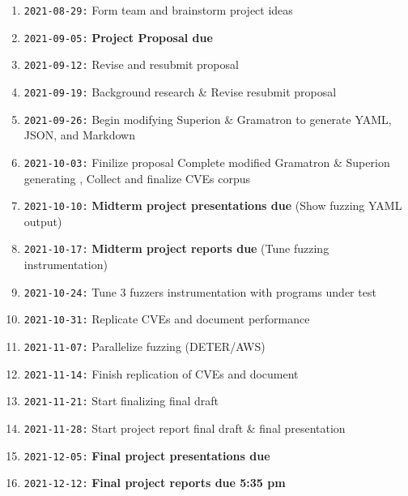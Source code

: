 \documentclass[12pt]{diazessay}
\begin{document}
\begin{enumerate}[label={}]
	\item \texttt{2021-08-29:} Form team and brainstorm project ideas
	\item \texttt{2021-09-05:} \textbf{Project Proposal due}
	\item \texttt{2021-09-12:} Revise and resubmit proposal
	\item \texttt{2021-09-19:} Background research \& Revise \/ resubmit proposal
	\item \texttt{2021-09-26:} Begin modifying Superion \& Gramatron to generate YAML, JSON, and Markdown
	\item \texttt{2021-10-03:} Finilize proposal Complete modified Gramatron \& Superion generating , Collect and finalize CVEs corpus
	\item \texttt{2021-10-10:} \textbf{Midterm project presentations due} \hfill (Show fuzzing YAML output)
	\item \texttt{2021-10-17:} \textbf{Midterm project reports due} \hfill (Tune fuzzing instrumentation)
	\item \texttt{2021-10-24:} Tune 3 fuzzers instrumentation with programs under test
	\item \texttt{2021-10-31:} Replicate CVEs and document performance
	\item \texttt{2021-11-07:} Parallelize fuzzing \hfill (DETER/AWS)
	\item \texttt{2021-11-14:} Finish replication of CVEs and document
	\item \texttt{2021-11-21:} Start finalizing final draft
	\item \texttt{2021-11-28:} Start project report final draft \& final presentation
	\item \texttt{2021-12-05:} \textbf{Final project presentations due}
	\item \texttt{2021-12-12:} \textbf{Final project reports due 5:35 pm}
\end{enumerate}


\clearpage


\end{document}
